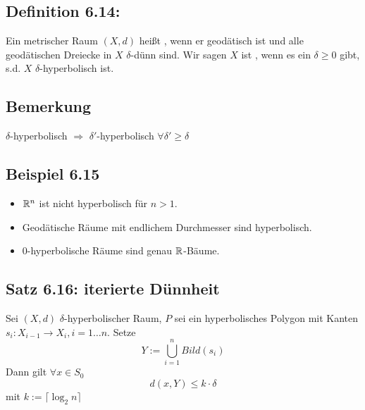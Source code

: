 \documentclass{article}
\begin{document}
\subsection{Definition 6.14: }
Ein metrischer Raum $(X,d)$ heißt , wenn er geodätisch ist und alle geodätischen Dreiecke in $X$ $\delta$-dünn sind. Wir sagen $X$ ist , wenn es ein $\delta \geq 0$ gibt, s.d. $X$ $\delta$-hyperbolisch ist.

\subsection{Bemerkung}
$\delta$-hyperbolisch $\Longrightarrow$ $\delta'$-hyperbolisch $\forall \delta' \geq \delta$

\subsection{Beispiel 6.15}
\begin{itemize}
	\item $\mathbb{R}^n$ ist nicht hyperbolisch für $n > 1$.
	\item Geodätische Räume mit endlichem Durchmesser sind hyperbolisch.
	\item 0-hyperbolische Räume sind genau $\mathbb{R}$-Bäume.
\end{itemize}

\subsection{Satz 6.16: iterierte Dünnheit}
Sei $(X,d)$ $\delta$-hyperbolischer Raum, $P$ sei ein hyperbolisches Polygon mit Kanten $s_i : X_{i-1} \rightarrow X_{i}, i = 1\ldots n$. Setze
\[Y:= \bigcup_{i=1}^n Bild(s_i) \]
Dann gilt $\forall x \in S_0$
\[d(x,Y) \leq k\cdot \delta \]
mit $k := \lceil\log_2n \rceil$
\end{document}
